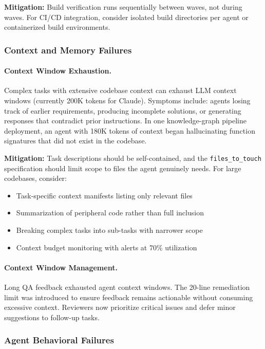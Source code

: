 \textbf{Mitigation:} Build verification runs sequentially between waves, not
during waves. For CI/CD integration, consider isolated build directories
per agent or containerized build environments.

\subsubsection{Context and Memory Failures}
\label{subsubsec:context-memory-detail}

\paragraph{Context Window Exhaustion.}
Complex tasks with extensive codebase context can exhaust LLM context windows
(currently 200K tokens for Claude). Symptoms include: agents losing track
of earlier requirements, producing incomplete solutions, or generating
responses that contradict prior instructions. In one knowledge-graph pipeline deployment, an agent
with 180K tokens of context began hallucinating function signatures that
did not exist in the codebase.

\textbf{Mitigation:} Task descriptions should be self-contained, and the
\texttt{files\_to\_touch} specification should limit scope to files the agent
genuinely needs. For large codebases, consider:
\begin{itemize}
    \item Task-specific context manifests listing only relevant files
    \item Summarization of peripheral code rather than full inclusion
    \item Breaking complex tasks into sub-tasks with narrower scope
    \item Context budget monitoring with alerts at 70\% utilization
\end{itemize}

\paragraph{Context Window Management.}
Long QA feedback exhausted agent context windows. The 20-line remediation
limit was introduced to ensure feedback remains actionable without
consuming excessive context. Reviewers now prioritize critical issues
and defer minor suggestions to follow-up tasks.

\subsubsection{Agent Behavioral Failures}
\label{subsubsec:agent-behavioral-detail}

